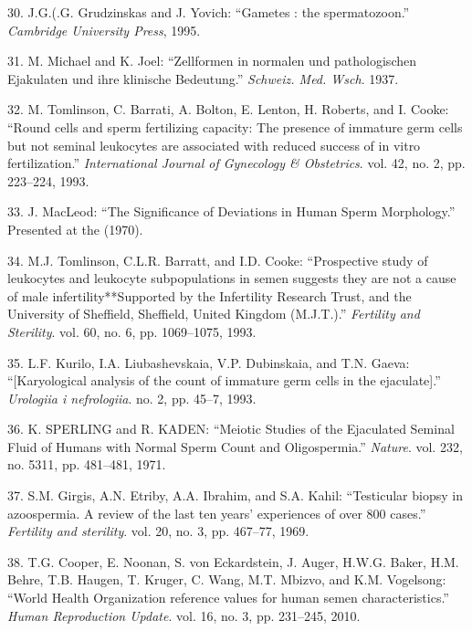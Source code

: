 \documentclass[12pt,twoside]{reedthesis}
\theoremstyle{definition}
\theoremstyle{definition}
\theoremstyle{remark}
\begin{document}
  \hypertarget{ref-Grudzinskas1995}{}
  30. J.G.(.G. Grudzinskas and J. Yovich: ``Gametes : the spermatozoon.''
  \emph{Cambridge University Press}, 1995.
  
  \hypertarget{ref-Michael1937}{}
  31. M. Michael and K. Joel: ``Zellformen in normalen und pathologischen
  Ejakulaten und ihre klinische Bedeutung.'' \emph{Schweiz. Med. Wsch}.
  1937.
  
  \hypertarget{ref-Tomlinson1993a}{}
  32. M. Tomlinson, C. Barrati, A. Bolton, E. Lenton, H. Roberts, and I.
  Cooke: ``Round cells and sperm fertilizing capacity: The presence of
  immature germ cells but not seminal leukocytes are associated with
  reduced success of in vitro fertilization.'' \emph{International Journal
  of Gynecology \& Obstetrics}. vol. 42, no. 2, pp. 223--224, 1993.
  
  \hypertarget{ref-MacLeod1970}{}
  33. J. MacLeod: ``The Significance of Deviations in Human Sperm
  Morphology.'' Presented at the (1970).
  
  \hypertarget{ref-Tomlinson1993}{}
  34. M.J. Tomlinson, C.L.R. Barratt, and I.D. Cooke: ``Prospective study
  of leukocytes and leukocyte subpopulations in semen suggests they are
  not a cause of male infertility**Supported by the Infertility Research
  Trust, and the University of Sheffield, Sheffield, United Kingdom
  (M.J.T.).'' \emph{Fertility and Sterility}. vol. 60, no. 6, pp.
  1069--1075, 1993.
  
  \hypertarget{ref-Kurilo}{}
  35. L.F. Kurilo, I.A. Liubashevskaia, V.P. Dubinskaia, and T.N. Gaeva:
  ``{[}Karyological analysis of the count of immature germ cells in the
  ejaculate{]}.'' \emph{Urologiia i nefrologiia}. no. 2, pp. 45--7, 1993.
  
  \hypertarget{ref-SPERLING1971}{}
  36. K. SPERLING and R. KADEN: ``Meiotic Studies of the Ejaculated
  Seminal Fluid of Humans with Normal Sperm Count and Oligospermia.''
  \emph{Nature}. vol. 232, no. 5311, pp. 481--481, 1971.
  
  \hypertarget{ref-Girgis}{}
  37. S.M. Girgis, A.N. Etriby, A.A. Ibrahim, and S.A. Kahil: ``Testicular
  biopsy in azoospermia. A review of the last ten years' experiences of
  over 800 cases.'' \emph{Fertility and sterility}. vol. 20, no. 3, pp.
  467--77, 1969.
  
  \hypertarget{ref-Cooper2010}{}
  38. T.G. Cooper, E. Noonan, S. von Eckardstein, J. Auger, H.W.G. Baker,
  H.M. Behre, T.B. Haugen, T. Kruger, C. Wang, M.T. Mbizvo, and K.M.
  Vogelsong: ``World Health Organization reference values for human semen
  characteristics.'' \emph{Human Reproduction Update}. vol. 16, no. 3, pp.
  231--245, 2010.
  
\end{document}
